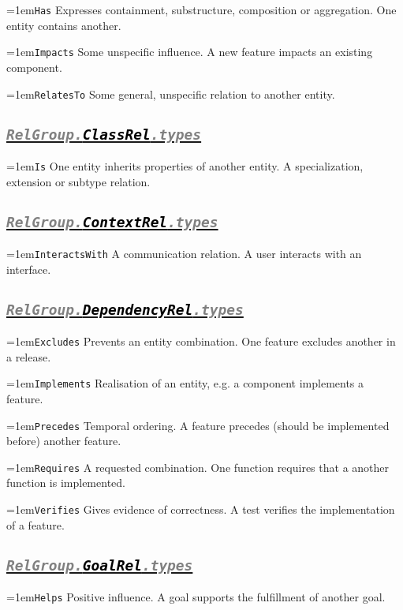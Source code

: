 \documentclass[a4paper,oneside]{article}
\newcommand\Concept[2]{\hangindent=1em\lstinline+#1+ #2}
\begin{document}
\begin{multicols*}{4}
\Concept{Has}{Expresses containment, substructure, composition or aggregation. One entity contains another.}

\Concept{Impacts}{Some unspecific influence. A new feature impacts an existing component.}

\Concept{RelatesTo}{Some general, unspecific relation to another entity.}


\subsection*{\underline{\texttt{\textit{{\textcolor{gray}{RelGroup.}\textcolor{black}{ClassRel}}\textcolor{gray}{.types}}}}}
\Concept{Is}{One entity inherits properties of another entity. A specialization, extension or subtype relation. }


\subsection*{\underline{\texttt{\textit{{\textcolor{gray}{RelGroup.}\textcolor{black}{ContextRel}}\textcolor{gray}{.types}}}}}
\Concept{InteractsWith}{A communication relation. A user interacts with an interface.}


\subsection*{\underline{\texttt{\textit{{\textcolor{gray}{RelGroup.}\textcolor{black}{DependencyRel}}\textcolor{gray}{.types}}}}}
\Concept{Excludes}{Prevents an entity combination. One feature excludes another in a release.}

\Concept{Implements}{Realisation of an entity, e.g. a component implements a feature.}

\Concept{Precedes}{Temporal ordering. A feature precedes (should be implemented before) another feature.}

\Concept{Requires}{A requested combination. One function requires that a another function is implemented.}

\Concept{Verifies}{Gives evidence of correctness. A test verifies the implementation of a feature.}


\subsection*{\underline{\texttt{\textit{{\textcolor{gray}{RelGroup.}\textcolor{black}{GoalRel}}\textcolor{gray}{.types}}}}}
\Concept{Helps}{Positive influence. A goal supports the fulfillment of another goal.}


\end{multicols*}
\end{document}
